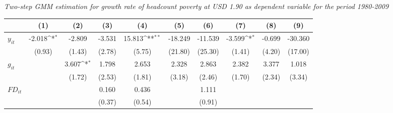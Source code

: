 \documentclass[12pt, a4paper]{article}
\begin{document}
\begin{table}
\begin{threeparttable}
\begin{tablenotes}
		\end{tablenotes}
	\end{threeparttable}
	\caption[Two-Step System-GMM Estimation Results for Headcount Poverty at USD 1.90 for 1980-2009]{\textit{Two-step GMM estimation for growth rate of headcount poverty at USD 1.90 as dependent variable for the period 1980-2009}}
	\label{2GMM1902010}
\end{table}

	\begin{table}
	\centering
	\scriptsize
	\setlength\tabcolsep{1pt}	
	\begin{threeparttable}
		{
			\def\sym#1{\ifmmode^{#1}\else\(^{#1}\)\fi}
			\begin{tabular}{l*{9}{c}}
				\hline\hline
				&\multicolumn{1}{c}{(1)}&\multicolumn{1}{c}{(2)}&\multicolumn{1}{c}{(3)}&\multicolumn{1}{c}{(4)}&\multicolumn{1}{c}{(5)}&\multicolumn{1}{c}{(6)}&\multicolumn{1}{c}{(7)}&\multicolumn{1}{c}{(8)}&\multicolumn{1}{c}{(9)}\\
				\hline
				$y_{it}$              &      -2.018\sym{*}  &      -2.809         &      -3.531         &      15.813\sym{**} &     -18.249         &     -11.539         &      -3.599\sym{*}  &      -0.699         &     -30.360         \\
				&      (0.93)         &      (1.43)         &      (2.78)         &      (5.75)         &     (21.80)         &     (25.30)         &      (1.41)         &      (4.20)         &     (17.00)         \\
				$g_{it}$              &                     &       3.607\sym{*}  &       1.798         &       2.653         &       2.328         &       2.863         &       2.382         &       3.377         &       1.018         \\
				&                     &      (1.72)         &      (2.53)         &      (1.81)         &      (3.18)         &      (2.46)         &      (1.70)         &      (2.34)         &      (3.34)         \\
				$FD_{it}$                &                     &                     &       0.160         &       0.436         &                     &       1.111         &                     &                     &                     \\
				&                     &                     &      (0.37)         &      (0.54)         &                     &      (0.91)         &                     &                     &                     \\

\end{tabular}}
\end{threeparttable}
\end{table}
\end{document}
